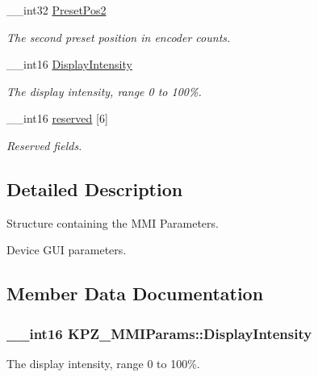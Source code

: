 \begin{DoxyCompactItemize}
\+\_\+\+\_\+int32 \hyperlink{struct_k_p_z___m_m_i_params_a5279d530673e8ac878cc6e1f992d2636}{Preset\+Pos2}
\begin{DoxyCompactList}\small\item\em The second preset position in encoder counts. \end{DoxyCompactList}\item 
\+\_\+\+\_\+int16 \hyperlink{struct_k_p_z___m_m_i_params_a8d5ee0b6c55224eaabe22e95d55ea32c}{Display\+Intensity}
\begin{DoxyCompactList}\small\item\em The display intensity, range 0 to 100\%. \end{DoxyCompactList}\item 
\+\_\+\+\_\+int16 \hyperlink{struct_k_p_z___m_m_i_params_acf9317bf4efb7dd1db4ec2468db9a6d4}{reserved} \mbox{[}6\mbox{]}
\begin{DoxyCompactList}\small\item\em Reserved fields. \end{DoxyCompactList}\end{DoxyCompactItemize}


\subsection{Detailed Description}
Structure containing the M\+MI Parameters. 

Device G\+UI parameters. 

\subsection{Member Data Documentation}
\subsubsection[{\texorpdfstring{Display\+Intensity}{DisplayIntensity}}]{\setlength{\rightskip}{0pt plus 5cm}\+\_\+\+\_\+int16 K\+P\+Z\+\_\+\+M\+M\+I\+Params\+::\+Display\+Intensity}\hypertarget{struct_k_p_z___m_m_i_params_a8d5ee0b6c55224eaabe22e95d55ea32c}{}\label{struct_k_p_z___m_m_i_params_a8d5ee0b6c55224eaabe22e95d55ea32c}


The display intensity, range 0 to 100\%. 

